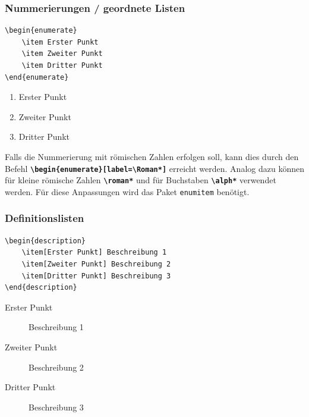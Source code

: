 \subsubsection{Nummerierungen / geordnete Listen}

\begin{minipage}{0.58\textwidth}
    \begin{lstlisting}[language={[LaTeX]TeX}]
\begin{enumerate}
    \item Erster Punkt
    \item Zweiter Punkt
    \item Dritter Punkt
\end{enumerate}
\end{lstlisting}
\end{minipage}
\hfill
\begin{minipage}{0.35\textwidth}
    \begin{enumerate}
        \item Erster Punkt
        \item Zweiter Punkt
        \item Dritter Punkt
    \end{enumerate}
\end{minipage}

Falls die Nummerierung mit römischen Zahlen erfolgen soll, kann dies durch den Befehl \textbf{\texttt{\textbackslash begin\{enumerate\}[label=\textbackslash Roman*]}} erreicht werden. Analog dazu können für kleine römische Zahlen \textbf{\texttt{\textbackslash roman*}} und für Buchstaben \textbf{\texttt{\textbackslash alph*}} verwendet werden. Für diese Anpassungen wird das Paket \texttt{enumitem} benötigt.

\subsubsection{Definitionslisten}

\begin{minipage}{0.58\textwidth}
    \begin{lstlisting}[language={[LaTeX]TeX}]
\begin{description}
    \item[Erster Punkt] Beschreibung 1
    \item[Zweiter Punkt] Beschreibung 2
    \item[Dritter Punkt] Beschreibung 3
\end{description}
\end{lstlisting}
\end{minipage}
\hfill
\begin{minipage}{0.35\textwidth}
    \begin{description}
        \item[Erster Punkt] Beschreibung 1
        \item[Zweiter Punkt] Beschreibung 2
        \item[Dritter Punkt] Beschreibung 3
    \end{description}
\end{minipage}

